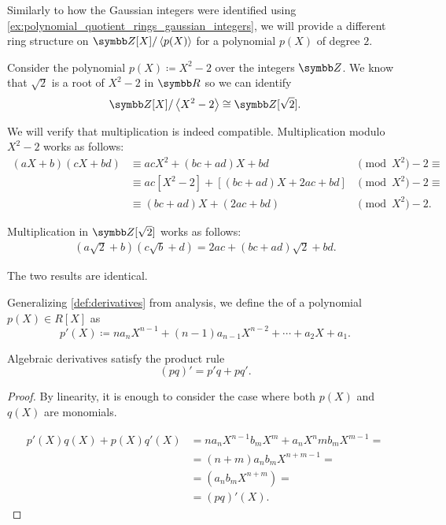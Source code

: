 \begin{example}\label{ex:polynomial_quotient_rings_z2}
  Similarly to how the Gaussian integers were identified using \cref{ex:polynomial_quotient_rings_gaussian_integers}, we will provide a different ring structure on \( \Z[X] / \Gen{p(X)} \) for a polynomial \( p(X) \) of degree \( 2 \).

  Consider the polynomial \( p(X) \coloneqq X^2 - 2 \) over the integers \( \Z \). We know that \( \sqrt 2 \) is a root of \( X^2 - 2 \) in \( \R \) so we can identify
  \begin{equation*}
    \Z[X] / \Gen{X^2 - 2} \cong \Z[\sqrt 2].
  \end{equation*}

  We will verify that multiplication is indeed compatible. Multiplication modulo \( X^2 - 2 \) works as follows:
  \begin{align*}
    (aX + b) (cX + bd)
    &\equiv
    acX^2 + (bc + ad)X + bd
    &\pmod X^2 - 2 \equiv \\ &\equiv
    ac[X^2 - 2] + [(bc + ad)X + 2ac + bd]
    &\pmod X^2 - 2 \equiv \\ &\equiv
    (bc + ad)X + (2ac + bd)
    &\pmod X^2 - 2. \phantom{\equiv}
  \end{align*}

  Multiplication in \( \Z[\sqrt 2] \) works as follows:
  \begin{align*}
    (a \sqrt 2 + b) (c \sqrt b + d)
    =
    2ac + (bc + ad) \sqrt 2 + bd.
  \end{align*}

  The two results are identical.
\end{example}

\begin{definition}\label{def:algebraic_derivative}
  Generalizing \cref{def:derivatives} from analysis, we define the  of a polynomial \( p(X) \in R[X] \) as
  \begin{equation*}
    p'(X) \coloneqq n a_n X^{n-1} + (n-1) a_{n-1} X^{n-2} + \cdots + a_2 X + a_1.
  \end{equation*}
\end{definition}

\begin{proposition}\label{thm:algebraic_derivative_product_rule}
  Algebraic derivatives satisfy the product rule
  \begin{equation*}
    (pq)' = p'q + pq'.
  \end{equation*}
\end{proposition}
\begin{proof}
  By linearity, it is enough to consider the case where both \( p(X) \) and \( q(X) \) are monomials.

  \begin{align*}
    p'(X) q(X) + p(X) q'(X)
    &=
    n a_n X^{n-1} b_m X^m + a_n X^n m b_m X^{m-1}
    = \\ &=
    (n + m) a_n b_m X^{n+m-1}
    = \\ &=
    (a_n b_m X^{n+m})
    = \\ &=
    (pq)'(X).
  \end{align*}
\end{proof}

